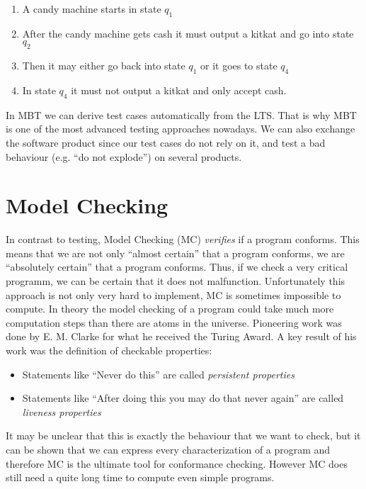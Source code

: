 \documentclass[a4paper, 12pt]{article} %
\begin{document}
\begin{enumerate}
  \item A candy machine starts in state $q_1$
  \item After the candy machine gets cash it must output a
  kitkat and go into state $q_2$
  \item Then it may either go back into state $q_1$ or it goes to state $q_4$
  \item In state $q_4$ it must not output a kitkat and only accept cash.
\end{enumerate}

In MBT we can derive test cases automatically from the LTS. That is why MBT
is one of the most advanced testing approaches nowadays. We can also exchange
the software product since our test cases do not rely on it, and test a bad
behaviour (e.g. ``do not explode'') on several products. 

\section*{Model Checking}
In contrast to testing, Model Checking (MC) \textit{verifies} if a program
conforms. This means that we are not only ``almost certain'' that a program
conforms, we are ``absolutely certain'' that a program conforms. Thus, if we
check a very critical programm, we can be certain that it does not malfunction.
Unfortunately this approach is not only very hard to implement, MC is sometimes
impossible to compute. In theory the model checking of a program could take much
more computation steps than there are atoms in the universe. Pioneering work was
done by E. M. Clarke for what he received the Turing Award. A key result of
his work was the definition of checkable properties:
\begin{itemize}
  \item Statements like ``Never do {\color{red}this}'' are called
  \textit{persistent properties}
  \item Statements like ``After doing {\color{red}this} you may do
  {\color{blue}that} never again'' are called \textit{liveness properties}
\end{itemize}

It may be unclear that this is exactly the behaviour that we want to check, but
it can be shown that we can express every characterization of a program and
therefore MC is the ultimate tool for conformance checking. However MC does
still need a quite long time to compute even simple programs. 
\end{document}
